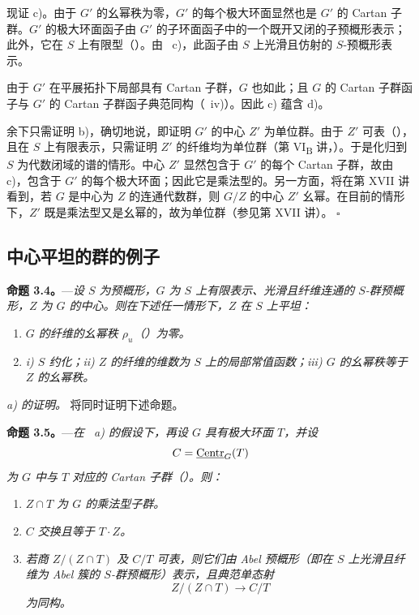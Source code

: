 现证 c)。由于 \(G'\) 的幺幂秩为零，\(G'\) 的每个极大环面显然也是 \(G'\) 的 Cartan 子群。\(G'\) 的极大环面函子由 \(G'\) 的子环面函子中的一个既开又闭的子预概形表示；此外，它在 \(S\) 上有限型（）。由 ~c)，此函子由 \(S\) 上光滑且仿射的 \(S\)-预概形表示。

由于 \(G'\) 在平展拓扑下局部具有 Cartan 子群，\(G\) 也如此；且 \(G\) 的 Cartan 子群函子与 \(G'\) 的 Cartan 子群函子典范同构（~iv)）。因此 c) 蕴含 d)。

余下只需证明 b)，确切地说，即证明 \(G'\) 的中心 \(Z'\) 为单位群。由于 \(Z'\) 可表（），且在 \(S\) 上有限表示，只需证明 \(Z'\) 的纤维均为单位群（第 VI\textsubscript{B} 讲，）。于是化归到 \(S\) 为代数闭域的谱的情形。中心 \(Z'\) 显然包含于 \(G'\) 的每个 Cartan 子群，故由 c)，包含于 \(G'\) 的每个极大环面；因此它是乘法型的。另一方面，将在第 XVII 讲看到，若 \(G\) 是中心为 \(Z\) 的连通代数群，则 \(G/Z\) 的中心 \(Z'\) 幺幂。在目前的情形下，\(Z'\) 既是乘法型又是幺幂的，故为单位群（参见第 XVII 讲）。
\hfill\(\square\)

\subsection*{中心平坦的群的例子}

\noindent{}%
\textbf{命题 3.4。}---\textit{设 \(S\) 为预概形，\(G\) 为 \(S\) 上有限表示、光滑且纤维连通的 \(S\)-群预概形，\(Z\) 为 \(G\) 的中心。则在下述任一情形下，\(Z\) 在 \(S\) 上平坦：}
\begin{enumerate}
\renewcommand{\labelenumi}{\textit{\alph{enumi})}}
\item \textit{\(G\) 的纤维的幺幂秩 \(\rho_u\)（）为零。}
\item \textit{i) \(S\) 约化；\quad ii) \(Z\) 的纤维的维数为 \(S\) 上的局部常值函数；\quad iii) \(G\) 的幺幂秩等于 \(Z\) 的幺幂秩。}
\end{enumerate}

\medskip
\noindent\textit{ a) 的证明。}
将同时证明下述命题。

\medskip
\noindent{}%
\textbf{命题 3.5。}---\textit{在 ~a) 的假设下，再设 \(G\) 具有极大环面 \(T\)，并设}
\[
  C=\underline{\operatorname{Centr}}_G(T)
\]
\textit{为 \(G\) 中与 \(T\) 对应的 Cartan 子群（）。则：}
\begin{enumerate}
\renewcommand{\labelenumi}{\textit{(\roman{enumi})}}
\item \textit{\(Z\cap T\) 为 \(G\) 的乘法型子群。}
\item \textit{\(C\) 交换且等于 \(T\cdot Z\)。}
\item \textit{若商 \(Z/(Z\cap T)\) 及 \(C/T\) 可表，则它们由 Abel 预概形（即在 \(S\) 上光滑且纤维为 Abel 簇的 \(S\)-群预概形）表示，且典范单态射}
\[
  Z/(Z\cap T)\longrightarrow C/T
\]
\textit{为同构。}
\end{enumerate}

